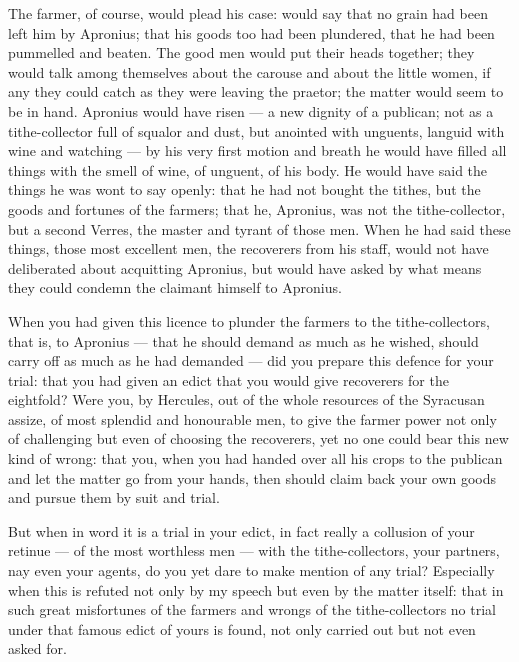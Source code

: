  The farmer, of course, would plead his case: would say that no grain had been left him by Apronius; that his goods too had been plundered, that he had been pummelled and beaten. The good men would put their heads together; they would talk among themselves about the carouse and about the little women, if any they could catch as they were leaving the praetor; the matter would seem to be in hand. Apronius would have risen --- a new dignity of a publican; not as a tithe-collector full of squalor and dust, but anointed with unguents, languid with wine and watching --- by his very first motion and breath he would have filled all things with the smell of wine, of unguent, of his body. He would have said the things he was wont to say openly: that he had not bought the tithes, but the goods and fortunes of the farmers; that he, Apronius, was not the tithe-collector, but a second Verres, the master and tyrant of those men. When he had said these things, those most excellent men, the recoverers from his staff, would not have deliberated about acquitting Apronius, but would have asked by what means they could condemn the claimant himself to Apronius.

 When you had given this licence to plunder the farmers to the tithe-collectors, that is, to Apronius --- that he should demand as much as he wished, should carry off as much as he had demanded --- did you prepare this defence for your trial: that you had given an edict that you would give recoverers for the eightfold? Were you, by Hercules, out of the whole resources of the Syracusan assize, of most splendid and honourable men, to give the farmer power not only of challenging but even of choosing the recoverers, yet no one could bear this new kind of wrong: that you, when you had handed over all his crops to the publican and let the matter go from your hands, then should claim back your own goods and pursue them by suit and trial.

 But when in word it is a trial in your edict, in fact really a collusion of your retinue --- of the most worthless men --- with the tithe-collectors, your partners, nay even your agents, do you yet dare to make mention of any trial? Especially when this is refuted not only by my speech but even by the matter itself: that in such great misfortunes of the farmers and wrongs of the tithe-collectors no trial under that famous edict of yours is found, not only carried out but not even asked for.

